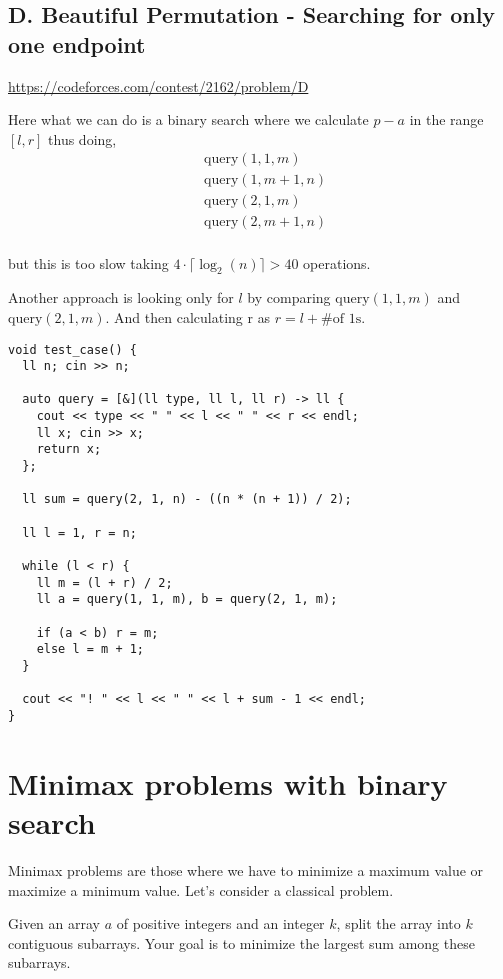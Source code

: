 \subsection{D. Beautiful Permutation - Searching for only one endpoint}
\url{https://codeforces.com/contest/2162/problem/D}

Here what we can do is a binary search where we calculate $p - a$ in the range $[l, r]$ thus doing,
\begin{align*}
    &\text{query}(1, 1, m) \\ 
    &\text{query}(1, m+1, n) \\ 
    &\text{query}(2, 1, m) \\
    &\text{query}(2, m+1, n) \\ 
\end{align*}

but this is too slow taking $4 \cdot \lceil \log_2(n) \rceil > 40$ operations.

Another approach is looking only for $l$ by comparing $\text{query}(1, 1, m)$ and $\text{query}(2, 1, m)$. And then calculating r as $ r = l + \text{\# of 1s}$.

\begin{verbatim}
void test_case() {
  ll n; cin >> n;
  
  auto query = [&](ll type, ll l, ll r) -> ll {
    cout << type << " " << l << " " << r << endl;
    ll x; cin >> x;
    return x;
  }; 
  
  ll sum = query(2, 1, n) - ((n * (n + 1)) / 2);

  ll l = 1, r = n;

  while (l < r) {
    ll m = (l + r) / 2;
    ll a = query(1, 1, m), b = query(2, 1, m);

    if (a < b) r = m;
    else l = m + 1;
  }
  
  cout << "! " << l << " " << l + sum - 1 << endl;
}
\end{verbatim}

\section{Minimax problems with binary search}
Minimax problems are those where we have to minimize a maximum value or maximize a minimum value. Let's consider a classical problem. \\ 

\begin{problem}
    Given an array $a$ of positive integers and an integer $k$, split the array into $k$ contiguous subarrays. Your goal is to minimize the largest sum among these subarrays.
\end{problem}

